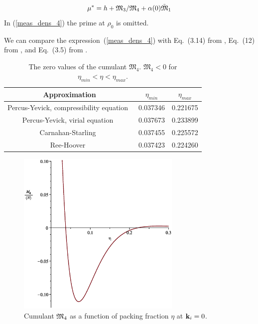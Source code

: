 \begin{equation}
	\label{mu_star}
	\mu^* = h + {\frak M_3}/{\frak M_4} + \alpha(0)\tilde{\frak M}_1
\end{equation}
In (\ref{meas_dens_4}) the prime at $\rho_0$ is omitted.

We can compare the expression~(\ref{meas_dens_4}) with Eq.~(3.14) from \cite{Yukh1990}, Eq.~(12) from \cite{YukhJSP1995}, and Eq.~(3.5) from \cite{Yukh2013}.

\begin{table}[h]
	\caption{The zero values of the cumulant $\mathfrak{M_4}$. $\mathfrak{M_4} < 0$ for $\eta_{min} < \eta < \eta_{max}$.}
	\label{tab:cum_m4_zeros}
	\begin{center}
		\begin{tabular}{|c|c|c|}
			\hline
			Approximation & $\eta_{min}$ & $\eta_{max}$ \\
			\hline
			Percus-Yevick, compressibility equation~\cite{WertheimPRL1963} \quad & 0.037346 \quad & 0.221675 \quad \\
			Percus-Yevick, virial equation~\cite{ThieleJCP1963}          			& 0.037673 & 0.233899 \\
			Carnahan-Starling~\cite{CarnahanStarling1969}		& 0.037455 & 0.225572 \\
			Ree-Hoover~\cite{ReeHooverJCP1964}					& 0.037423 & 0.224260 \\
			\hline
		\end{tabular}
	\end{center}
\end{table}

\begin{figure}[htbp]
	\includegraphics[width=0.7\textwidth,angle=0]{M4_at_k_equals_0_as_function_of_eta}
	\caption{Cumulant $\frak M_4$ as a function of packing fraction $\eta$ at $\vb k_i = 0$.}
	\label{m4_fig1}
\end{figure}

